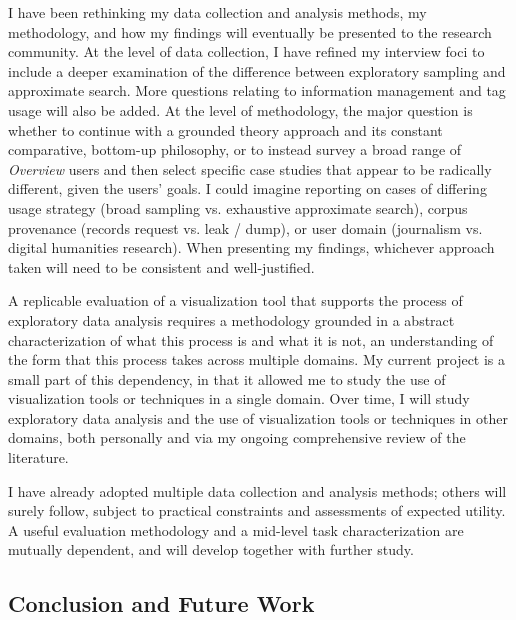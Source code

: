 I have been rethinking my data collection and analysis methods, my methodology, and how my findings will eventually be presented to the research community. 
At the level of data collection, I have refined my interview foci to include a deeper examination of the difference between exploratory sampling and approximate search. 
More questions relating to information management and tag usage will also be added. 
At the level of methodology, the major question is whether to continue with a grounded theory approach and its constant comparative, bottom-up philosophy, or to instead survey a broad range of {\it Overview} users and then select specific case studies that appear to be radically different, given the users' goals. 
I could imagine reporting on cases of differing usage strategy (broad sampling vs. exhaustive approximate search), corpus provenance (records request vs. leak / dump), or user domain (journalism vs. digital humanities research). 
When presenting my findings, whichever approach taken will need to be consistent and well-justified.

A replicable evaluation of a visualization tool that supports the process of exploratory data analysis requires a methodology grounded in a abstract characterization of what this process is and what it is not, an understanding of the form that this process takes across multiple domains. 
My current project is a small part of this dependency, in that it allowed me to study the use of visualization tools or techniques in a single domain.
Over time, I will study exploratory data analysis and the use of visualization tools or techniques in other domains, both personally and via my ongoing comprehensive review of the literature.

I have already adopted multiple data collection and analysis methods; others will surely follow, subject to practical constraints and assessments of expected utility.
A useful evaluation methodology and a mid-level task characterization are mutually dependent, and will develop together with further study.

\subsection{Conclusion and Future Work}
\label{app:overview:prelim-conclusion}

